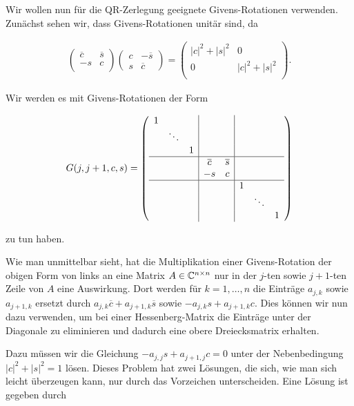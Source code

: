 \documentclass{article}
\theoremstyle{plain}
\begin{document}
Wir wollen nun für die QR-Zerlegung geeignete Givens-Rotationen verwenden. Zunächst sehen wir, dass Givens-Rotationen unitär sind, da

\begin{align*}
\left(\begin{array}{cc}
\overline{c}& \overline{s} \\
-s & c\\
\end{array}\right)\left(\begin{array}{cc}
c & -\overline{s} \\
s & \overline{c}
\end{array}\right)
=
\left(\begin{array}{cc}
|c|^2 + |s|^2 & 0 \\
0 & |c|^2 + |s|^2 \\
\end{array}\right).
\end{align*}


Wir werden es mit Givens-Rotationen der Form

$$
G(j,j+1,c,s) =
    \left(\begin{array}{ccc|cc|ccc}
    1 & & & & & & & \\
    & \ddots & & & & & & \\
    & & 1 & & & & & \\
    \hline
    & & & \overline{c} & \overline{s} & & & \\
    & & & -s & c & & &\\
    \hline
    & & & & & 1 & & \\
    & & & & & & \ddots & \\
    & & & & & & & 1\\
    \end{array}\right)
$$

zu tun haben.

Wie man unmittelbar sieht, hat die Multiplikation einer Givens-Rotation der obigen Form von links an eine Matrix $A\in \mathbb{C}^{n\times n}$ nur in der $j$-ten sowie $j+1$-ten Zeile von $A$ eine Auswirkung. Dort werden für $k = 1,\dots, n$ die Einträge $a_{j,k}$ sowie $a_{j+1, k}$ ersetzt durch $a_{j,k}\overline{c} + a_{j+1, k}\overline{s}$ sowie $-a_{j,k}s + a_{j+1, k}c$. Dies können wir nun dazu verwenden, um bei einer Hessenberg-Matrix die Einträge unter der Diagonale zu eliminieren und dadurch eine obere Dreiecksmatrix erhalten.

Dazu müssen wir die Gleichung $-a_{j,j}s + a_{j+1, j}c = 0$ unter der Nebenbedingung $|c|^2 + |s|^2 = 1$ lösen. Dieses Problem hat zwei Lösungen, die sich, wie man sich leicht überzeugen kann, nur durch das Vorzeichen unterscheiden. Eine Lösung ist gegeben durch
\end{document}
